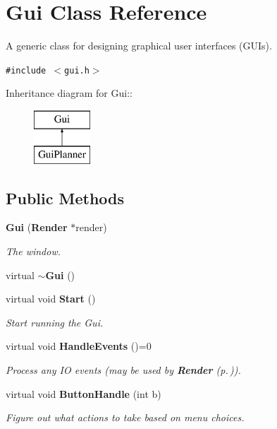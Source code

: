 \section{Gui  Class Reference}
\label{classGui}
A generic class for designing graphical user interfaces (GUIs). 


{\tt \#include $<$gui.h$>$}

Inheritance diagram for Gui::\begin{figure}[H]
\begin{center}
\leavevmode
\includegraphics[height=2cm]{classGui}
\end{center}
\end{figure}
\subsection*{Public Methods}
\begin{CompactItemize}
\item 
{\bf Gui} ({\bf Render} $\ast$render)
\begin{CompactList}\small\item\em The window.\item\end{CompactList}\item 
virtual {\bf $\sim$Gui} ()
\item 
virtual void {\bf Start} ()
\begin{CompactList}\small\item\em Start running the Gui.\item\end{CompactList}\item 
virtual void {\bf Handle\-Events} ()=0
\begin{CompactList}\small\item\em Process any IO events (may be used by {\bf Render} {\rm (p.\,\pageref{classRender})}).\item\end{CompactList}\item 
virtual void {\bf Button\-Handle} (int b)
\begin{CompactList}\small\item\em Figure out what actions to take based on menu choices.\item\end{CompactList}\end{CompactItemize}
